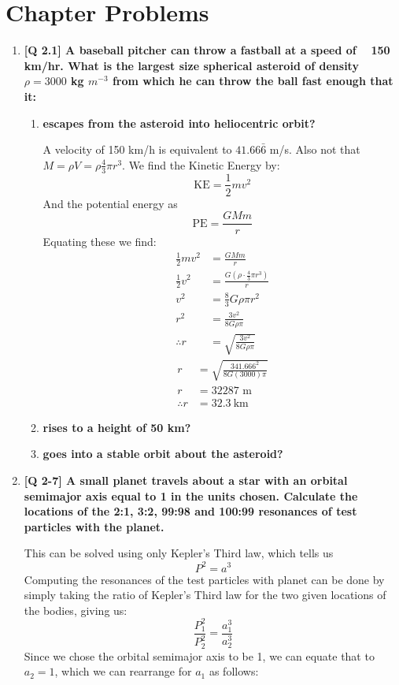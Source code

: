 \documentclass[10pt]{article}
\begin{document}
	\section{Chapter Problems}
	\begin{enumerate}
		\item  \textbf{[Q 2.1] A baseball pitcher can throw a fastball at a speed of ~ 150 km/hr. What is the largest size spherical asteroid of density $\rho = 3000$ kg $m^{-3}$ from which he can throw the ball fast enough that it:} 
		\begin{enumerate}
			\item  \textbf{escapes from the asteroid into heliocentric orbit?}
			
			A velocity of 150 km/h is equivalent to $41.66\bar{6}$ m/s. Also not that $M = \rho V = \rho \frac{4}{3} \pi r^3$. We find the Kinetic Energy by:
			\[ \text{KE} = \frac{1}{2} mv^2 \]
			And the potential energy as 
			\[ \text{PE} = \frac{GMm}{r} \]
			Equating these we find:
			\begin{align*}
				\frac{1}{2} mv^2 &= \frac{GMm}{r} \\
				\frac{1}{2} v^2 &= \frac{G \left( \rho \cdot \frac{4}{3} \pi r^3 \right)}{r} \\
				v^2 &=  \frac{8}{3} G \rho \pi r^2 \\
				r^2 &= \frac{3 v^2}{8 G \rho \pi} \\
				\therefore r &= \sqrt{\frac{3 v^2}{8 G \rho \pi}} 
			\end{align*}
			\begin{align*}
				r &= \sqrt{\frac{3 41.666^2}{8 G (3000) \pi}} \\
				r &= 32 287 \text{ m} \\
				\therefore r &= 32.3 \ \text{km}
			\end{align*}
			\item  \textbf{rises to a height of 50 km?}
			\item  \textbf{goes into a stable orbit about the asteroid?}
		\end{enumerate}
		
		
		
		
		\newpage 
		\item  \textbf{ [Q 2-7] A small planet travels about a star with an orbital semimajor axis equal to 1 in the units chosen. Calculate the locations of the 2:1, 3:2, 99:98 and 100:99 resonances of test particles with the planet.}
		
		This can be solved using only Kepler's Third law, which tells us 
		\[P^2 = a^3 \]
		Computing the resonances of the test particles with planet can be done by simply taking the ratio of Kepler's Third law for the two given locations of the bodies, giving us:
		\[ \frac{P_1^2}{P_2^2} = \frac{a_1^3}{a_2^3} \]
		Since we chose the orbital semimajor axis to be 1, we can equate that to $a_2 = 1$, which we can rearrange for $a_1$ as follows:
		

\end{enumerate}
\end{document}
